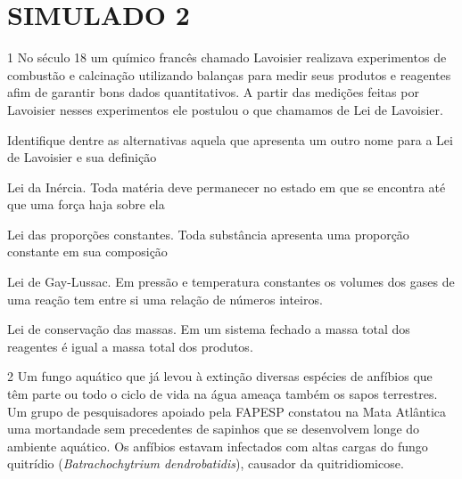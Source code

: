 \chapter{SIMULADO 2}

\num{1}
  No século 18 um químico francês chamado Lavoisier realizava
  experimentos de combustão e calcinação utilizando balanças para medir
  seus produtos e reagentes afim de garantir bons dados quantitativos. A
  partir das medições feitas por Lavoisier nesses experimentos ele
  postulou o que chamamos de Lei de Lavoisier.


Identifique dentre as alternativas aquela que apresenta um outro nome
para a Lei de Lavoisier e sua definição

\begin{escolha}
\item
  Lei da Inércia. Toda matéria deve permanecer no estado em que se
  encontra até que uma força haja sobre ela
\item
  Lei das proporções constantes. Toda substância apresenta uma proporção
  constante em sua composição
\item
  Lei de Gay-Lussac. Em pressão e temperatura constantes os volumes dos
  gases de uma reação tem entre si uma relação de números inteiros.
\item
  Lei de conservação das massas. Em um sistema fechado a massa total dos
  reagentes é igual a massa total dos produtos.
\end{escolha}


\num{2}
  Um fungo aquático que já levou à extinção diversas espécies de
  anfíbios que têm parte ou todo o ciclo de vida na água ameaça também
  os sapos terrestres. Um grupo de pesquisadores apoiado pela FAPESP
  constatou na Mata Atlântica uma mortandade sem precedentes de sapinhos
  que se desenvolvem longe do ambiente aquático. Os anfíbios estavam
  infectados com altas cargas do fungo quitrídio (\emph{Batrachochytrium
  dendrobatidis}), causador da quitridiomicose.

